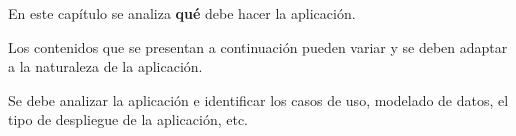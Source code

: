 
En este capítulo se analiza \textbf{qué} debe hacer la aplicación.

Los contenidos que se presentan a continuación pueden variar y se deben adaptar a la naturaleza de la aplicación.

Se debe analizar la aplicación e identificar los casos de uso, modelado de datos, el tipo de despliegue de la aplicación, etc.
